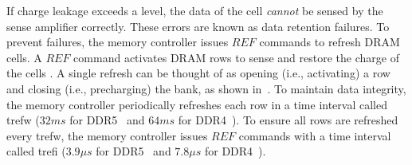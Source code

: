 If charge leakage exceeds a level, the data of the cell \emph{cannot} be sensed by the sense amplifier correctly. These errors are known as data retention failures. To prevent  failures, 
the memory controller issues $REF$ commands to refresh DRAM cells. A $REF$ command  activates DRAM rows to sense and restore the charge  of the cells . A single refresh can be thought of as opening (i.e., activating) a row and closing (i.e., precharging) the bank, as shown in~.
{To maintain data integrity, the memory controller periodically refreshes each row in a time interval called \gls{trefw} ($32 ms$ for DDR5~\cite{jedec2020ddr5} and $64 ms$ for DDR4~\cite{jedec2017ddr4}). To ensure all rows are refreshed every \gls{trefw}, the memory controller issues $REF$ commands with a time interval called \gls{trefi} ($3.9 \mu s$ for DDR5~\cite{jedec2020ddr5} and $7.8 \mu s$ for DDR4~\cite{jedec2017ddr4}).} 

